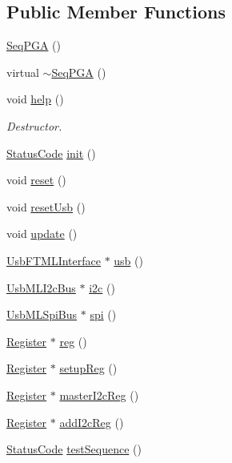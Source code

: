 \subsection*{Public Member Functions}
\begin{DoxyCompactItemize}
\item 
\hyperlink{classSeqPGA_a032240de5048a496dcce57ac28e10f65}{Seq\+P\+GA} ()
\item 
virtual \hyperlink{classSeqPGA_ac36a18cf2f56796a78fb91a1afc5cc1b}{$\sim$\+Seq\+P\+GA} ()
\item 
void \hyperlink{classSeqPGA_ae651bb2d5ac33e863951499c638655fe}{help} ()
\begin{DoxyCompactList}\small\item\em Destructor. \end{DoxyCompactList}\item 
\hyperlink{classStatusCode}{Status\+Code} \hyperlink{classSeqPGA_aba1ead90de9e6f14042d8838db5ebe5b}{init} ()
\item 
void \hyperlink{classSeqPGA_aaadcbdd7ad7c96d2d69549b820da6809}{reset} ()
\item 
void \hyperlink{classSeqPGA_aea7d31e0cce81ea4dcad7d4534ff4493}{reset\+Usb} ()
\item 
void \hyperlink{classSeqPGA_a0003d286a27a82024d84b392edab2c3b}{update} ()
\item 
\hyperlink{classUsbFTMLInterface}{Usb\+F\+T\+M\+L\+Interface} $\ast$ \hyperlink{classSeqPGA_a10c68ea9de38eb0445d47e4b21b580a1}{usb} ()
\item 
\hyperlink{classUsbMLI2cBus}{Usb\+M\+L\+I2c\+Bus} $\ast$ \hyperlink{classSeqPGA_ad1629388bbd38b013110ee03a1eea339}{i2c} ()
\item 
\hyperlink{classUsbMLSpiBus}{Usb\+M\+L\+Spi\+Bus} $\ast$ \hyperlink{classSeqPGA_a9c6993bb241b4cc474d525f65696099a}{spi} ()
\item 
\hyperlink{classRegister}{Register} $\ast$ \hyperlink{classSeqPGA_a43c48f29313ca63046cc8efc6cc73e23}{reg} ()
\item 
\hyperlink{classRegister}{Register} $\ast$ \hyperlink{classSeqPGA_a83598ab914c8e3ee5afa34c5e6e7fdf4}{setup\+Reg} ()
\item 
\hyperlink{classRegister}{Register} $\ast$ \hyperlink{classSeqPGA_a3906fe0cdfd9042a67c0fa35ae75147a}{master\+I2c\+Reg} ()
\item 
\hyperlink{classRegister}{Register} $\ast$ \hyperlink{classSeqPGA_a80eec67d433c12f8fcdf1ad73c6b8f59}{add\+I2c\+Reg} ()
\item 
\hyperlink{classStatusCode}{Status\+Code} \hyperlink{classSeqPGA_a299f2826e5edba5636f0f41233683156}{test\+Sequence} ()

\end{DoxyCompactItemize}
